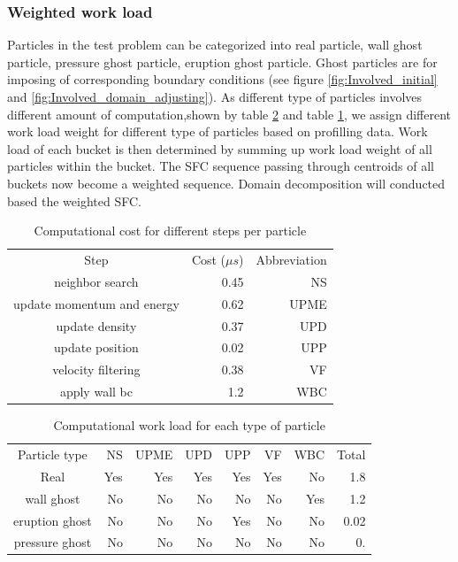 \documentclass[10pt,a4paper]{article}
\begin{document}
\subsubsection{Weighted work load}
Particles in the test problem can be categorized into real particle, wall ghost particle, pressure ghost particle, eruption ghost particle. Ghost particles are for imposing of corresponding boundary conditions (see figure \ref{fig:Involved_initial} and \ref{fig:Involved_domain_adjusting}). As different type of particles involves different amount of computation,shown by table \ref{tab:Computational_cost_particles} and table \ref{tab:Computational_cost_steps}, we assign different work load weight for different type of particles based on profilling data. Work load of each bucket is then determined by summing up work load weight of all particles within the bucket. The SFC sequence passing through centroids of all buckets now become a weighted sequence. Domain decomposition will conducted based the weighted SFC.
\begin{table}[h!]
  \centering
  \caption{Computational cost for different steps per particle}
  \label{tab:Computational_cost_steps}
  \begin{tabular}{|c|r|r|}
    \hline
    Step & Cost ($\mu s$) & Abbreviation\\
    \hhline{|=|=|=|}
    neighbor search & 0.45 & NS\\
    \hline
    update momentum and energy & 0.62 & UPME\\
    \hline
    update density & 0.37 & UPD\\
    \hline
    update position & 0.02 & UPP\\
    \hline
    velocity filtering& 0.38 & VF\\
    \hline
    apply wall bc & 1.2 & WBC\\
    \hline
  \end{tabular}
\end{table}

\begin{table}[h!]
  \centering
  \caption{Computational work load for each type of particle}
  \label{tab:Computational_cost_particles}
  \begin{tabular}{|c|r|r|r|r|r|r|r|}
    \hline
    Particle type & NS & UPME & UPD & UPP &VF &WBC &Total\\
    \hhline{|=|=|=|=|=|=|=|=|}
    Real & Yes & Yes & Yes & Yes & Yes & No & 1.8\\
    \hline
    wall ghost & No & No & No & No & No & Yes &1.2\\
    \hline
    eruption ghost & No & No & No & Yes & No & No & 0.02\\
    \hline
    pressure ghost & No & No & No & No & No & No & 0.\\
    \hline
  \end{tabular}
\end{table}
\end{document}
